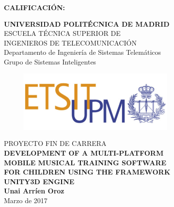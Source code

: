 {\large{\bf CALIFICACIÓN:}}
\pagestyle{empty}
\cleardoublepage
\vspace*{\baselineskip}
\begin{center}
	{\LARGE\rm\textbf{UNIVERSIDAD POLITÉCNICA DE MADRID}\\
	\vspace{1.0cm}
	 ESCUELA TÉCNICA SUPERIOR DE\\ INGENIEROS DE TELECOMUNICACIÓN
	  }  \\

	 {\Large\rm Departamento de Ingeniería de Sistemas Telemáticos\\
	 Grupo de Sistemas Inteligentes  }  \\

\begin{figure}[!htbp]
	\centering
    \includegraphics[width=0.7\textwidth]{img/logo_etsit.jpg}

\end{figure}
	\vspace{1.0cm}
	{{\LARGE\rm PROYECTO FIN DE CARRERA\\
	\vspace{1.0cm}
	 \textbf{DEVELOPMENT OF A MULTI-PLATFORM}\\	 
	 \textbf{MOBILE MUSICAL TRAINING SOFTWARE}\\ 
	 \textbf{FOR CHILDREN USING THE FRAMEWORK}\\
	 \vspace{0.5cm}
	 \textbf{UNITY3D ENGINE} }}  \\
	 
	 \vspace{1.0cm}
     \Large\rm\textbf{Unai Arríen Oroz}\\
	 \vspace{1.0cm}
	 Marzo de 2017
\end{center}  

%
